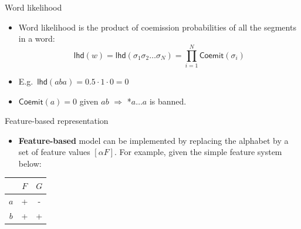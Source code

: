 \begin{frame}[fragile]{Word likelihood}
\begin{center}
\end{center}

\begin{itemize}
\item Word likelihood is the product of coemission probabilities of all the segments in a word:
\begin{equation*}
\textsf{lhd}(w)  = \textsf{lhd}(\sigma_1\sigma_2\ldots\sigma_{N})= \prod_{i=1}^{N} \textsf{Coemit}\left(\sigma_{i}\right)
\end{equation*}
\item E.g.\ $\textsf{lhd}(aba) = 0.5\cdot1\cdot0 = 0$
\item  $\textsf{Coemit}(a) = 0$ given $ab$ \hfill $\Rightarrow$ *$a\ldots a$ is banned.
\end{itemize}
\end{frame}


\begin{frame}{Feature-based representation}
\begin{itemize}
\item \textbf{Feature-based} model can be implemented by replacing the alphabet by a set of feature values $[\alpha F]$. For example, given the simple feature system below:
\end{itemize}
\begin{center}
    \begin{tabular}{@{}ccc@{}}
		\toprule
		& $F$& $G$ \\ \midrule
		$a$ & +                & -                \\
		$b$ & +                & +                \\\bottomrule
	\end{tabular}
\end{center}
\end{frame}

